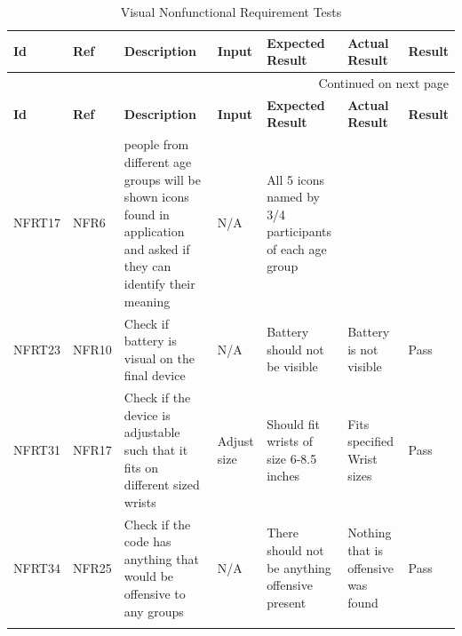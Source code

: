 \documentclass[12pt, titlepage]{article}
\begin{document}
\begin{longtable}{|p{1.4cm}|p{1.1cm}|p{2.5cm}|p{1.5cm}|p{2.2cm}|p{1.9cm}|p{1.2cm}|}

  \endfirsthead
  \hline
  \textbf{Id} & \textbf{Ref} & \textbf{Description}                                                         & \textbf{Input}                                    & \textbf{Expected Result}                                    & \textbf{Actual Result} & \textbf{Result}                                    \\ \hline

  \endhead

  \hline \multicolumn{7}{|r|}{Continued on next page} \\ \hline
  \endfoot
   
  \endlastfoot
  \hline
  \textbf{Id} & \textbf{Ref} & \textbf{Description}                                                         & \textbf{Input}                                    & \textbf{Expected Result}    & \textbf{Actual Result}                          & \textbf{Result}                                     \\ \hline
  NFRT17        &  NFR6         & people from different age groups will be shown icons found in application and asked if they can identify their meaning                   & N/A    & All 5 icons named by 3/4 participants of each age group    &    & \cellcolor[HTML]{FFFFFF}{\color[HTML]{F8A102} TBD}                         \\ \hline
  NFRT23        &  NFR10        & Check if battery is visual on the final device             & N/A      & Battery should not be visible          & Battery is not visible       & {\color[HTML]{32CB00} Pass}                         \\ \hline
  NFRT31        &  NFR17        & Check if the device is adjustable such that it fits on different sized wrists            & Adjust size      & Should fit wrists of size 6-8.5 inches          & Fits specified Wrist sizes       & {\color[HTML]{32CB00} Pass}                         \\ \hline
  NFRT34        &  NFR25        & Check if the code has anything that would be offensive to any groups             & N/A      & There should not be anything offensive present          & Nothing that is offensive was found       & {\color[HTML]{32CB00} Pass}                         \\ \hline
  \caption{Visual Nonfunctional Requirement Tests}
  \label{VisualNonfunctionalRequirementTests}
\end{longtable}
\end{document}
